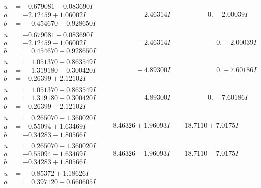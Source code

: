 \documentclass[1p]{elsarticle_modified}
\theoremstyle{definition}
\begin{document}
$$\begin{array}{c|c|c}
\begin{aligned}
u &= -0.679081 + 0.083690 I \\
a &= -2.12459 + 1.06002 I \\
b &= \phantom{-}0.454670 + 0.928650 I\end{aligned}
 & \phantom{-0.000000 -}2.46314 I & \phantom{-0.000000 } 0. - 2.00039 I \\ \hline\begin{aligned}
u &= -0.679081 - 0.083690 I \\
a &= -2.12459 - 1.06002 I \\
b &= \phantom{-}0.454670 - 0.928650 I\end{aligned}
 & \phantom{-0.000000 } -2.46314 I & \phantom{-0.000000 -}0. + 2.00039 I \\ \hline\begin{aligned}
u &= \phantom{-}1.051370 + 0.863549 I \\
a &= \phantom{-}1.319180 - 0.300420 I \\
b &= -0.26399 + 2.12102 I\end{aligned}
 & \phantom{-0.000000 } -4.89300 I & \phantom{-0.000000 -}0. + 7.60186 I \\ \hline\begin{aligned}
u &= \phantom{-}1.051370 - 0.863549 I \\
a &= \phantom{-}1.319180 + 0.300420 I \\
b &= -0.26399 - 2.12102 I\end{aligned}
 & \phantom{-0.000000 -}4.89300 I & \phantom{-0.000000 } 0. - 7.60186 I \\ \hline\begin{aligned}
u &= \phantom{-}0.265070 + 1.360020 I \\
a &= -0.55094 + 1.63469 I \\
b &= -0.34283 - 1.80566 I\end{aligned}
 & \phantom{-}8.46326 + 1.96093 I & \phantom{-}18.7110 + 7.0175 I \\ \hline\begin{aligned}
u &= \phantom{-}0.265070 - 1.360020 I \\
a &= -0.55094 - 1.63469 I \\
b &= -0.34283 + 1.80566 I\end{aligned}
 & \phantom{-}8.46326 - 1.96093 I & \phantom{-}18.7110 - 7.0175 I \\ \hline\begin{aligned}
u &= \phantom{-}0.85372 + 1.18626 I \\
a &= \phantom{-}0.397120 - 0.660605 I \\

\end{aligned}
\end{array}$$
\end{document}
